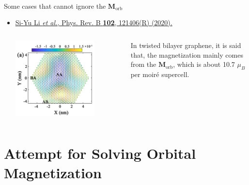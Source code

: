 \documentclass{beamer}
\newcommand{\purple}{\textcolor{purple}}
\begin{document}
\begin{frame}{Some cases that cannot ignore the \(\bm{M}_{\text{orb}}\)}
\begin{itemize}
        \item \purple{\href{https://doi.org/10.1103/PhysRevB.102.121406}{Si-Yu Li \emph{et al.}, Phys. Rev. B \textbf{102}, 121406(R) (2020).}}\\
        \begin{columns}
          \begin{column}{0.35\textwidth}
            \includegraphics[width=0.75\textwidth]{figure/Graphene.png}
          \end{column}
          \begin{column}{0.6\textwidth}\footnotesize
            In twisted bilayer graphene, it is said that, the magnetization  mainly comes from the \(\bm{M}_{\text{orb}}\), which is about 10.7 \(\mu_B\) per moir\'e supercell.
          \end{column}
        \end{columns}
      \end{itemize}
    \end{frame}
  
    \section{Attempt for Solving Orbital Magnetization}
\end{document}
